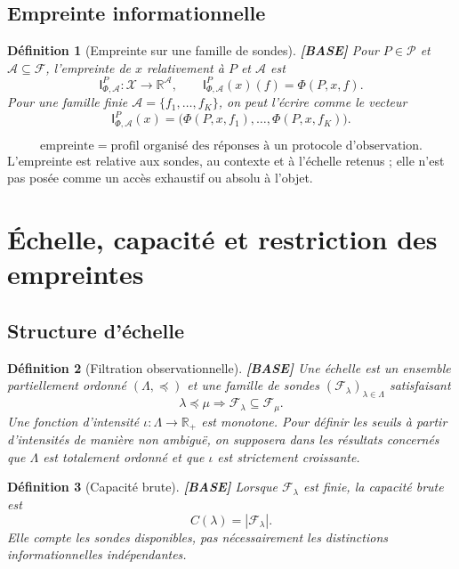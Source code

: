 \documentclass[11pt,a4paper]{article}
\newtheorem{definition}{Définition}[section]
\theoremstyle{remark}
\newcommand{\R}{\mathbb R}
\newcommand{\X}{\mathcal X}
\newcommand{\Pctx}{\mathcal P}
\newcommand{\F}{\mathcal F}
\newcommand{\Lam}{\Lambda}
\newcommand{\Emp}{\mathsf I}
\begin{document}
\subsection{Empreinte informationnelle}
\begin{definition}[Empreinte sur une famille de sondes] \textbf{[BASE]}
Pour $P\in\Pctx$ et $\mathcal A\subseteq\F$, l'empreinte de $x$ relativement à $P$ et $\mathcal A$ est
\[
\Emp_{\Phi,\mathcal A}^{P}:\X\to\R^{\mathcal A},\qquad
\Emp_{\Phi,\mathcal A}^{P}(x)(f)=\Phi(P,x,f).
\]
Pour une famille finie $\mathcal A=\{f_1,\ldots,f_K\}$, on peut l'écrire comme le vecteur
\[
\Emp_{\Phi,\mathcal A}^{P}(x)=\big(\Phi(P,x,f_1),\ldots,\Phi(P,x,f_K)\big).
\]
\end{definition}

\[
\boxed{\text{empreinte} = \text{profil organisé des réponses à un protocole d'observation}.}
\]
L'empreinte est relative aux sondes, au contexte et à l'échelle retenus ; elle n'est pas posée comme un accès exhaustif ou absolu à l'objet.

\section{Échelle, capacité et restriction des empreintes}

\subsection{Structure d'échelle}
\begin{definition}[Filtration observationnelle] \textbf{[BASE]}
Une échelle est un ensemble partiellement ordonné $(\Lam,\preceq)$ et une famille de sondes $(\F_\lambda)_{\lambda\in\Lam}$ satisfaisant
\[
\lambda\preceq\mu\Longrightarrow\F_\lambda\subseteq\F_\mu.
\]
Une fonction d'intensité $\iota:\Lam\to\R_+$ est monotone. Pour définir les seuils à partir d'intensités de manière non ambiguë, on supposera dans les résultats concernés que $\Lam$ est totalement ordonné et que $\iota$ est strictement croissante.
\end{definition}

\begin{definition}[Capacité brute] \textbf{[BASE]}
Lorsque $\F_\lambda$ est finie, la capacité brute est
\[
C(\lambda)=|\F_\lambda|.
\]
Elle compte les sondes disponibles, pas nécessairement les distinctions informationnelles indépendantes.
\end{definition}
\end{document}

